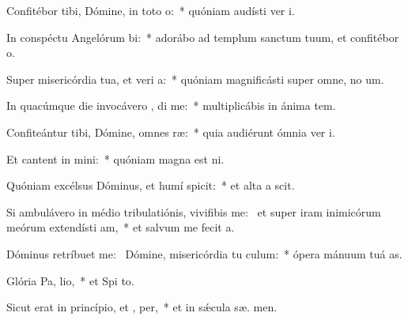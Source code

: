 \item Confitébor tibi, Dómine, in toto  o:~* quóniam audísti ver  i.
\item In conspéctu Angelórum  bi:~* adorábo ad templum sanctum tuum, et confitébor  o.
\item Super misericórdia tua, et veri a:~* quóniam magnificásti super omne, no  um.
\item In quacúmque die invocávero , di me:~* multiplicábis in ánima  tem.
\item Confiteántur tibi, Dómine, omnes  ræ:~* quia audiérunt ómnia ver  i.
\item Et cantent in  mini:~* quóniam magna est  ni.
\item Quóniam excélsus Dóminus, et humí spicit:~* et alta a  scit.
\item Si ambulávero in médio tribulatiónis, vivifibis me:~\pscross{} et super iram inimicórum meórum extendísti  am,~* et salvum me fecit  a.
\item Dóminus retríbuet  me:~\pscross{} Dómine, misericórdia tu  culum:~* ópera mánuum tuá  as.
\item Glória Pa,  lio,~* et Spi to.
\item Sicut erat in princípio, et ,  per,~* et in sǽcula sæ. men.
